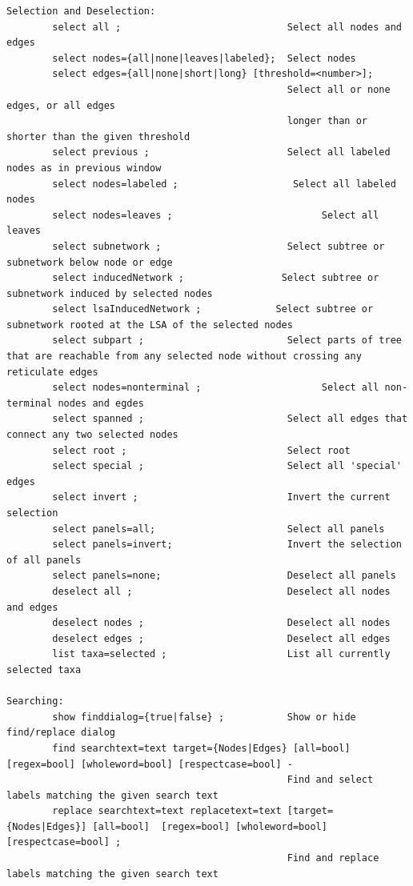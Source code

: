 \documentclass[11pt]{article}
\begin{document}
\begin{verbatim}
Selection and Deselection:
        select all ;                             Select all nodes and edges
        select nodes={all|none|leaves|labeled};  Select nodes
        select edges={all|none|short|long} [threshold=<number>];
                                                 Select all or none edges, or all edges
                                                 longer than or shorter than the given threshold
        select previous ;                        Select all labeled nodes as in previous window
        select nodes=labeled ;                    Select all labeled nodes
        select nodes=leaves ;                          Select all leaves
        select subnetwork ;                      Select subtree or subnetwork below node or edge
        select inducedNetwork ;                 Select subtree or subnetwork induced by selected nodes
        select lsaInducedNetwork ;             Select subtree or subnetwork rooted at the LSA of the selected nodes
        select subpart ;                         Select parts of tree that are reachable from any selected node without crossing any reticulate edges 
        select nodes=nonterminal ;                     Select all non-terminal nodes and egdes
        select spanned ;                         Select all edges that connect any two selected nodes 
        select root ;                            Select root
        select special ;                         Select all 'special' edges
        select invert ;                          Invert the current selection
        select panels=all;                       Select all panels
        select panels=invert;                    Invert the selection of all panels
        select panels=none;                      Deselect all panels
        deselect all ;                           Deselect all nodes and edges
        deselect nodes ;                         Deselect all nodes
        deselect edges ;                         Deselect all edges
        list taxa=selected ;                     List all currently selected taxa     

Searching:
        show finddialog={true|false} ;           Show or hide find/replace dialog
        find searchtext=text target={Nodes|Edges} [all=bool] [regex=bool] [wholeword=bool] [respectcase=bool] -
                                                 Find and select labels matching the given search text
        replace searchtext=text replacetext=text [target={Nodes|Edges}] [all=bool]  [regex=bool] [wholeword=bool] [respectcase=bool] ; 
                                                 Find and replace labels matching the given search text


\end{verbatim}
\end{document}
